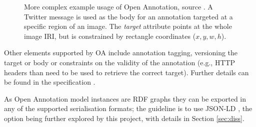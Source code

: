 \begin{figure}[!ht]
  \centering
  \caption[Twitter message used to annotate an image region using Open Annotation.]
          {More complex example usage of Open Annotation, source \cite{ref:oahubble}.
           A Twitter message is used as the body for an annotation targeted at a
           specific region of an image. The \textit{target} attribute points at the whole
           image IRI, but is constrained by rectangle coordinates
           ($x, y, w, h$).}
  \label{fig:oahubble}
\end{figure}

Other elements supported by OA include annotation tagging, versioning the
target or body or constraints on the validity of the annotation (e.g., HTTP
headers than need to be used to retrieve the correct target). Further details
can be found in the specification \cite{ref:oa}.

As Open Annotation model instances are RDF graphs they can be exported in any
of the supported serialisation formats; the guideline is to use JSON-LD
\cite{ref:oa}, the option being further explored by this project, with details
in Section \ref{sec:diss}.
